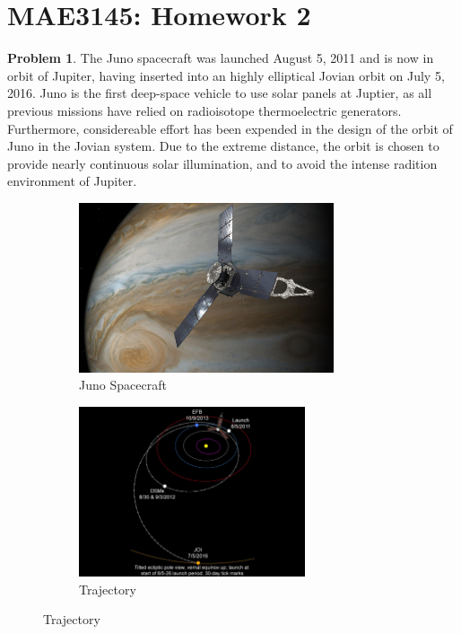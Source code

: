 \documentclass[10pt]{article}
\date{}
\theoremstyle{definition}
\newtheorem{prob}{Problem}[section]
\begin{document}
\pagestyle{empty}
\section*{MAE3145: Homework 2}
\vspace*{-0.4cm}

\begin{prob}
    The Juno spacecraft was launched August 5, 2011 and is now in orbit of Jupiter, having inserted into an highly elliptical Jovian orbit on July 5, 2016.
    Juno is the first deep-space vehicle to use solar panels at Juptier, as all previous missions have relied on radioisotope thermoelectric generators. 
    Furthermore, considereable effort has been expended in the design of the orbit of Juno in the Jovian system. 
    Due to the extreme distance, the orbit is chosen to provide nearly continuous solar illumination, and to avoid the intense radition environment of Jupiter.
    \begin{figure}[htbp]
        \centering
        \begin{subfigure}[htbp]{0.5\textwidth} 
            \includegraphics[height=5cm, keepaspectratio]{figures/juno.jpg} 
            \caption{Juno Spacecraft \label{fig:juno}} 
        \end{subfigure}\hfill
        \begin{subfigure}[htbp]{0.5\textwidth} 
            \includegraphics[height=5cm,keepaspectratio]{figures/trajectory.jpg} 
            \caption{Trajectory \label{fig:trajectory<`4`>}} 
        \end{subfigure} 
    \end{figure}
        

\end{prob}
\end{document}
